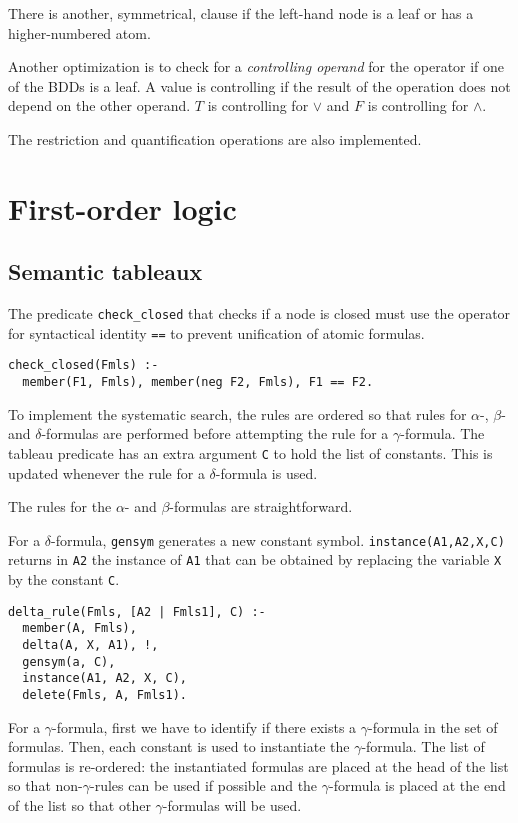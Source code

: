 \documentclass[11pt]{article}
\newcommand*{\p}[1]{\textup{\texttt{#1}}}
\begin{document}
There is another, symmetrical, clause if the left-hand node is a leaf or
has a higher-numbered atom.

Another optimization is to check for a \emph{controlling operand}
for the operator if one of the BDDs is a leaf. A value is controlling if
the result of the operation does not depend on the other operand. $T$ is
controlling for $\vee$ and $F$ is controlling for $\wedge$.

The restriction and quantification operations are also implemented.

\section{First-order logic}

\subsection{Semantic tableaux}\label{s.tabfol}

The predicate \p{check\_closed} that checks if a node is closed must use
the operator for syntactical identity \p{==} to prevent unification of
atomic formulas.

\begin{verbatim}
check_closed(Fmls) :-
  member(F1, Fmls), member(neg F2, Fmls), F1 == F2.
\end{verbatim}

To implement the systematic search, the rules are ordered so that rules
for $\alpha$-, $\beta$- and $\delta$-formulas are performed before
attempting the rule for a $\gamma$-formula. The tableau predicate has an
extra argument \p{C} to hold the list of constants. This is updated
whenever the rule for a $\delta$-formula is used.

The rules for the $\alpha$- and $\beta$-formulas are straightforward.

For a $\delta$-formula, \p{gensym} generates a new constant symbol.
\p{instance(A1,A2,X,C)} returns in \p{A2} the instance of \p{A1} that
can be obtained by replacing the variable \p{X} by the constant \p{C}.

\begin{verbatim}
delta_rule(Fmls, [A2 | Fmls1], C) :-
  member(A, Fmls),
  delta(A, X, A1), !,
  gensym(a, C),
  instance(A1, A2, X, C),
  delete(Fmls, A, Fmls1).
\end{verbatim}

For a $\gamma$-formula, first we have to identify if there exists a
$\gamma$-formula in the set of formulas. Then, each constant is used to
instantiate the $\gamma$-formula. The list of formulas is re-ordered:
the instantiated formulas are placed at the head of the list so that
non-$\gamma$-rules can be used if possible and the $\gamma$-formula is
placed at the end of the list so that other $\gamma$-formulas will be
used.
\end{document}
